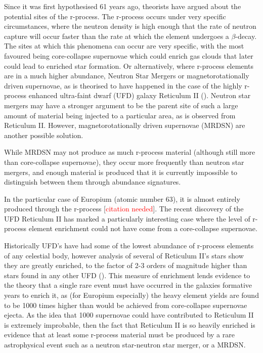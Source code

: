 \documentclass[a4paper,fleqn,usenatbib]{mnras}
\newcommand{\todo}[1]{\textcolor{red}{#1}}
\begin{document}
	Since it was first hypothesised 61 years ago, theorists have argued about the potential sites of the r-process. The r-process occurs under very specific circumstances, where the neutron density is high enough that the rate of neutron capture will occur faster than the rate at which the element undergoes a $\beta$-decay. The sites at which this phenomena can occur are very specific, with the most favoured being core-collapse supernovae which could enrich gas clouds that later could lead to enriched star formation. Or alternatively, where r-process elements are in a much higher abundance, Neutron Star Mergers or magnetorotationally driven supernovae, as is theorised to have happened in the case of the highly r-process enhanced ultra-faint dwarf (UFD) galaxy Reticulum II (\cite{Ji2016}). Neutron star mergers may have a stronger argument to be the parent site of such a large amount of material being injected to a particular area, as is observed from Reticulum II. However, magnetorotationally driven supernovae (MRDSN) are another possible solution. 

	While MRDSN may not produce as much r-process material (although still more than core-collapse supernovae), they occur more frequently than neutron star mergers, and enough material is produced that it is currently impossible to distinguish between them through abundance signatures.
	
	In the particular case of Europium (atomic number 63), it is almost entirely produced through the r-process [\todo{citation needed}]. The recent discovery of the UFD Reticulum II has marked a particularly interesting case where the level of r-process element enrichment could not have come from a core-collapse supernovae.

	Historically UFD's have had some of the lowest abundance of r-process elements of any celestial body, however analysis of several of Reticulum II's stars show they are greatly enriched, to the factor of 2-3 orders of magnitude higher than stars found in any other UFD (\cite{Ji2016}). This measure of enrichment lends evidence to the theory that a single rare event must have occurred in the galaxies formative years to enrich it, as (for Europium especially) the heavy element yields are found to be 1000 times higher than would be achieved from core-collapse supernovae ejecta. As the idea that 1000 supernovae could have contributed to Reticulum II is extremely improbable, then the fact that Reticulum II is so heavily enriched is evidence that at least some r-process material must be produced by a rare astrophysical event such as a neutron star-neutron star merger, or a MRDSN.
	
\end{document}
